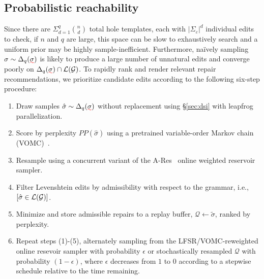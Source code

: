 \documentclass[sigplan,review,anonymous,acmsmall]{acmart}\settopmatter{printfolios=false,printccs=false,printacmref=false}
\begin{document}
\pagebreak\subsection{Probabilistic reachability}\label{sec:adaptive}

Since there are $\Sigma_{d=1}^q{n \choose d}$ total hole templates, each with $|\Sigma_\varepsilon| ^d$ individual edits to check, if $n$ and $q$ are large, this space can be slow to exhaustively search and a uniform prior may be highly sample-inefficient. Furthermore, na\"ively sampling $\sigma\sim\Delta_{q}(\err{\sigma})$ is likely to produce a large number of unnatural edits and converge poorly on $\Delta_{q}(\err{\sigma})\cap\mathcal{L}(\mathcal{G})$. To rapidly rank and render relevant repair recommendations, we prioritize candidate edits according to the following six-step procedure:

\begin{enumerate}
    \vspace{5pt}\item Draw samples $\hat\sigma \sim \Delta_q(\err{\sigma})$ without replacement using \S\ref{sec:dsi} with leapfrog \vspace{2pt}parallelization.
    \vspace{5pt}\item Score by perplexity $PP(\hat\sigma)$ using a pretrained variable-order Markov chain (VOMC)~\cite{schulz2008vomc}.
    \vspace{5pt}\item Resample using a concurrent variant of the A-Res~\cite{efraimidis2015weighted} online weighted reservoir sampler.
    \vspace{5pt}\item Filter Levenshtein edits by admissibility with respect to the grammar, i.e., $[\hat\sigma \in \mathcal{L}\vspace{2pt}(\mathcal{G})]$.
    \vspace{5pt}\item Minimize and store admissible repairs to a replay buffer, $\mathcal{Q} \leftarrow \tilde\sigma$, ranked by perplexity.
    \vspace{5pt}\item Repeat steps (1)-(5), alternately sampling from the LFSR/VOMC-reweighted online resevoir sampler with probability $\epsilon$ or stochastically resampled $\mathcal{Q}$ with probability $(1-\epsilon)$, where $\epsilon$ decreases from $1$ to $0$ according to a stepwise schedule relative to the time remaining.
\end{enumerate}
\end{document}
